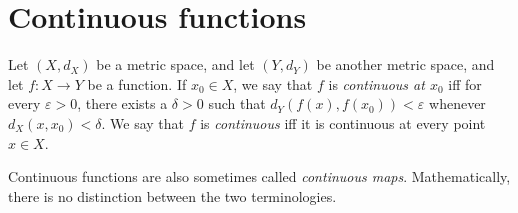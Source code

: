 \section{Continuous functions}\label{sec 2.1}

\begin{definition}\label{2.1.1}
    Let \((X, d_X)\) be a metric space, and let \((Y, d_Y)\) be another metric space, and let \(f : X \to Y\) be a function.
    If \(x_0 \in X\), we say that \(f\) is \emph{continuous at \(x_0\)} iff for every \(\varepsilon > 0\), there exists a \(\delta > 0\) such that \(d_Y(f(x), f(x_0 )) < \varepsilon\) whenever \(d_X(x, x_0) < \delta\).
    We say that \(f\) is \emph{continuous} iff it is continuous at every point \(x \in X\).
\end{definition}

\begin{remark}\label{2.1.2}
    Continuous functions are also sometimes called \emph{continuous maps}.
    Mathematically, there is no distinction between the two terminologies.
\end{remark}